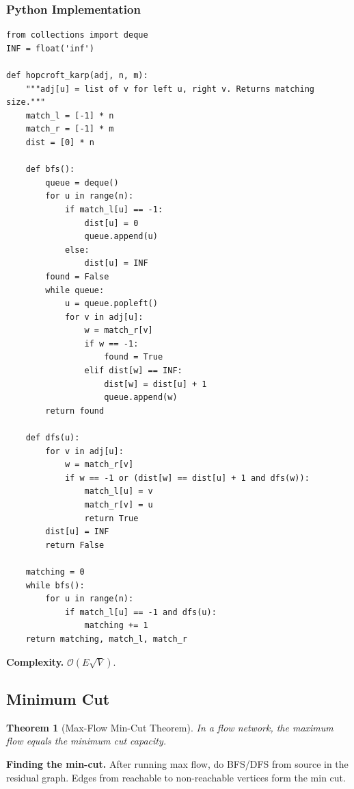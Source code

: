 \documentclass[10pt,a4paper]{article}
\theoremstyle{cpstyle}
\newtheorem{theorem}{Theorem}[section]
\newcommand{\bigO}[1]{\mathcal{O}\!\left(#1\right)}
\begin{document}
\subsubsection{Python Implementation}
\begin{lstlisting}[caption={Hopcroft-Karp maximum bipartite matching}]
from collections import deque
INF = float('inf')

def hopcroft_karp(adj, n, m):
    """adj[u] = list of v for left u, right v. Returns matching size."""
    match_l = [-1] * n
    match_r = [-1] * m
    dist = [0] * n

    def bfs():
        queue = deque()
        for u in range(n):
            if match_l[u] == -1:
                dist[u] = 0
                queue.append(u)
            else:
                dist[u] = INF
        found = False
        while queue:
            u = queue.popleft()
            for v in adj[u]:
                w = match_r[v]
                if w == -1:
                    found = True
                elif dist[w] == INF:
                    dist[w] = dist[u] + 1
                    queue.append(w)
        return found

    def dfs(u):
        for v in adj[u]:
            w = match_r[v]
            if w == -1 or (dist[w] == dist[u] + 1 and dfs(w)):
                match_l[u] = v
                match_r[v] = u
                return True
        dist[u] = INF
        return False

    matching = 0
    while bfs():
        for u in range(n):
            if match_l[u] == -1 and dfs(u):
                matching += 1
    return matching, match_l, match_r
\end{lstlisting}

\textbf{Complexity.} $\bigO{E\sqrt{V}}$.

\subsection{Minimum Cut}

\begin{theorem}[Max-Flow Min-Cut Theorem]
In a flow network, the maximum flow equals the minimum cut capacity.
\end{theorem}

\textbf{Finding the min-cut.} After running max flow, do BFS/DFS from source in the residual graph. Edges from reachable to non-reachable vertices form the min cut.
\end{document}
